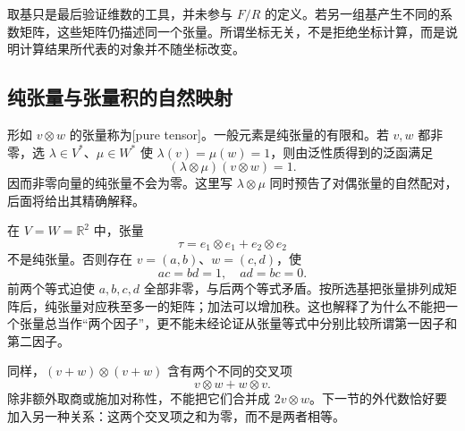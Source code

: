 取基只是最后验证维数的工具，并未参与 \(F/R\) 的定义。若另一组基产生不同的系数矩阵，这些矩阵仍描述同一个张量。所谓坐标无关，不是拒绝坐标计算，而是说明计算结果所代表的对象并不随坐标改变。

\subsection{纯张量与张量积的自然映射}
\label{b1:subsec:B10102}

形如 \(v\otimes w\) 的张量称为[pure tensor]。一般元素是纯张量的有限和。若 \(v,w\) 都非零，选 \(\lambda\in V^*\)、\(\mu\in W^*\) 使 \(\lambda(v)=\mu(w)=1\)，则由泛性质得到的泛函满足
\[
 (\lambda\otimes\mu)(v\otimes w)=1.
\]
因而非零向量的纯张量不会为零。这里写 \(\lambda\otimes\mu\) 同时预告了对偶张量的自然配对，后面将给出其精确解释。

\ProseParagraphBreak

在 \(V=W=\mathbb R^2\) 中，张量
\[
 \tau=e_1\otimes e_1+e_2\otimes e_2
\]
不是纯张量。否则存在 \(v=(a,b)\)、\(w=(c,d)\)，使
\[
 ac=bd=1,\quad ad=bc=0.
\]
前两个等式迫使 \(a,b,c,d\) 全部非零，与后两个等式矛盾。按所选基把张量排列成矩阵后，纯张量对应秩至多一的矩阵；加法可以增加秩。这也解释了为什么不能把一个张量总当作“两个因子”，更不能未经论证从张量等式中分别比较所谓第一因子和第二因子。

\ProseParagraphBreak

同样，\((v+w)\otimes(v+w)\) 含有两个不同的交叉项
\[
 v\otimes w+w\otimes v.
\]
除非额外取商或施加对称性，不能把它们合并成 \(2v\otimes w\)。下一节的外代数恰好要加入另一种关系：这两个交叉项之和为零，而不是两者相等。

